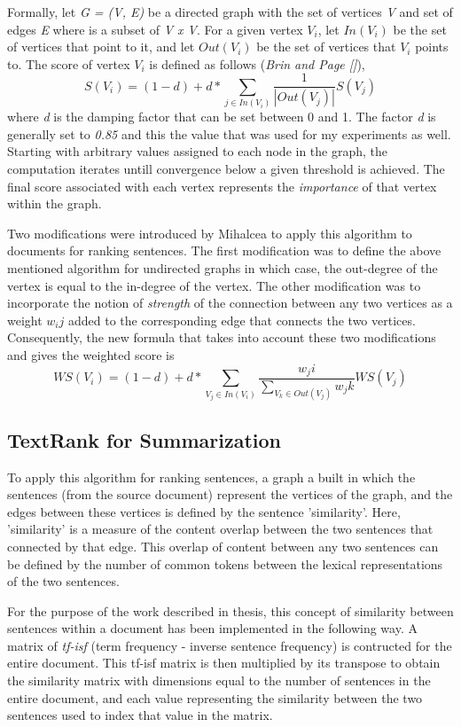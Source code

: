 Formally, let \emph{G = (V, E)} be a directed graph with the set of vertices \emph{V} and set of edges \emph{E} where is a subset of \emph{{V x V}}.
For a given vertex \(V_i\), let \(In(V_i)\) be the set of vertices that point to it, and let \(Out(V_i)\) be the set of vertices that \(V_i\) points to.
The score of vertex \(V_i\) is defined as follows (\emph{Brin and Page []}),
\[S(V_i) = (1 - d) + d * \sum_{j \in In(V_i)} \frac{1}{|Out(V_j)|}S(V_j)\]
where \emph{d} is the damping factor that can be set between 0 and 1.
The factor \emph{d} is generally set to \emph{0.85} and this the value that was used for my experiments as well.
Starting with arbitrary values assigned to each node in the graph, the computation iterates untill convergence below a given threshold is achieved.
The final score associated with each vertex represents the \textit{importance} of that vertex within the graph.

Two modifications were introduced by Mihalcea \cite{mihalcea-tarau:2004:EMNLP} to apply this algorithm to documents for ranking sentences.
The first modification was to define the above mentioned algorithm for undirected graphs in which case, the out-degree of the vertex is equal to the in-degree of the vertex.
The other modification was to incorporate the notion of \textit{strength} of the connection between any two vertices as a weight \(w_ij\) added to the corresponding edge that connects the two vertices.
Consequently, the new formula that takes into account these two modifications and gives the weighted score is
\[WS(V_i) = (1 - d) + d * \sum_{V_j \in In(V_i)} \frac{w_ji}{\sum_{V_k \in Out(V_j)}w_jk}WS(V_j)\]

\subsection{TextRank for Summarization}
To apply this algorithm for ranking sentences, a graph a built in which the sentences (from the source document) represent the vertices of the graph, and the edges between these vertices is defined by the sentence 'similarity'.
Here, 'similarity' is a measure of the content overlap between the two sentences that connected by that edge.
This overlap of content between any two sentences can be defined by the number of common tokens between the lexical representations of the two sentences.

For the purpose of the work described in thesis, this concept of similarity between sentences within a document has been implemented in the following way.
A matrix of \emph{tf-isf} (term frequency - inverse sentence frequency) is contructed for the entire document.
This tf-isf matrix is then multiplied by its transpose to obtain the similarity matrix with dimensions equal to the number of sentences in the entire document, and each value representing the similarity between the two sentences used to index that value in the matrix.

